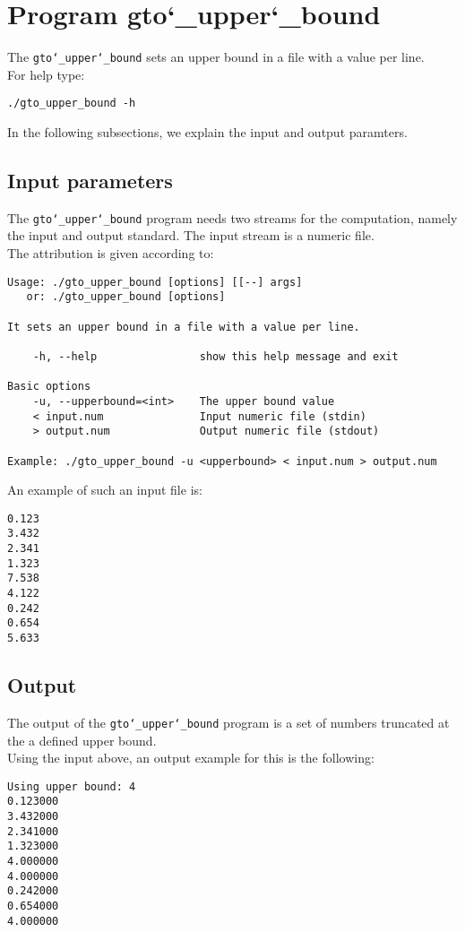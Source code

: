 \section{Program gto\char`_upper\char`_bound}
The \texttt{gto\char`_upper\char`_bound} sets an upper bound in a file with a value per line.\\
For help type:
\begin{lstlisting}
./gto_upper_bound -h
\end{lstlisting}
In the following subsections, we explain the input and output paramters.

\subsection*{Input parameters}

The \texttt{gto\char`_upper\char`_bound} program needs two streams for the computation, namely the input and output standard. The input stream is a numeric file.\\
The attribution is given according to:
\begin{lstlisting}
Usage: ./gto_upper_bound [options] [[--] args]
   or: ./gto_upper_bound [options]

It sets an upper bound in a file with a value per line.

    -h, --help                show this help message and exit

Basic options
    -u, --upperbound=<int>    The upper bound value
    < input.num               Input numeric file (stdin)
    > output.num              Output numeric file (stdout)

Example: ./gto_upper_bound -u <upperbound> < input.num > output.num
\end{lstlisting}
An example of such an input file is:
\begin{lstlisting}
0.123
3.432
2.341
1.323
7.538
4.122
0.242
0.654
5.633
\end{lstlisting}

\subsection*{Output}
The output of the \texttt{gto\char`_upper\char`_bound} program is a set of numbers truncated at the a defined upper bound.\\
Using the input above, an output example for this is the following:
\begin{lstlisting}
Using upper bound: 4
0.123000
3.432000
2.341000
1.323000
4.000000
4.000000
0.242000
0.654000
4.000000
\end{lstlisting}